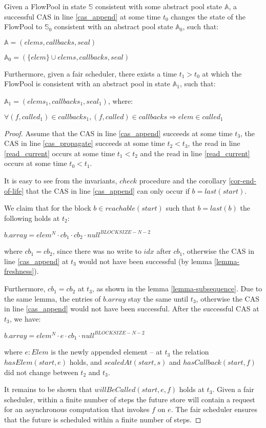 \documentclass[runningheads,a4paper]{llncs}
\begin{document}
\begin{lemma}\label{lemma-append}
Given a FlowPool in state $\mathbb{S}$ consistent with some abstract pool state $\mathbb{A}$, 
a successful CAS in line \ref{cas_append} at some time $t_0$ changes the state of the FlowPool 
to $\mathbb{S}_0$ consistent with an abstract pool state $\mathbb{A}_0$, such that:

$\mathbb{A} = (elems, callbacks, seal)$

$\mathbb{A}_0 = (\{elem\} \cup elems, callbacks, seal)$

Furthermore, given a fair scheduler, there exists a time $t_1 > t_0$ at which the FlowPool 
is consistent with an abstract pool in state $\mathbb{A}_1$, such that:

$\mathbb{A}_1 = (elems_1, callbacks_1, seal_1)$, where:

$\forall (f, called_1) \in callbacks_1, (f, called) \in callbacks \Rightarrow elem \in called_1$
\end{lemma}

\begin{proof}
Assume that the CAS in line \ref{cas_append} succeeds at some time
$t_3$, the CAS in line \ref{cas_propagate} succeeds at some time $t_2 <
t_3$, the read in line \ref{read_current} occurs at some time $t_1 <
t_2$ and the read in line \ref{read_current} occurs at some time $t_0
< t_1$.

It is easy to see from the invariants, $check$ procedure and the
corollary \ref{cor-end-of-life} that the CAS in line \ref{cas_append} can only
occur if $b = last(start)$.

We claim that for the block $b \in reachable(start)$ such that $b = last(b)$ the
following holds at $t_2$:

$b.array = elem^N \cdot cb_1 \cdot cb_2 \cdot null^{BLOCKSIZE - N - 2}$

where $cb_1 = cb_2$, since there was no write to $idx$ after $cb_1$, otherwise the
CAS in line \ref{cas_append} at $t_3$ would not have been successful
(by lemma \ref{lemma-freshness}).

Furthermore, $cb_1 = cb_2$ at $t_3$, as shown in the lemma
\ref{lemma-subsequence}. Due to the same lemma, the entries of
$b.array$ stay the same until $t_3$, otherwise the CAS in line
\ref{cas_append} would not have been successful.
After the successful CAS at $t_3$, we have:

$b.array = elem^N \cdot e \cdot cb_1 \cdot null^{BLOCKSIZE - N - 2}$

where $e: Elem$ is the newly appended element -- at $t_3$ the
relation $hasElem(start, e)$ holds, and $sealedAt(start, s)$ and
$hasCallback(start, f)$ did not change between $t_2$ and $t_3$.

It remains to be shown that $willBeCalled(start, e, f)$ holds at $t_3$.
Given a fair scheduler, within a finite number of steps the
future store will contain a request for an asynchronous computation
that invokes $f$ on $e$. The fair scheduler ensures that the future is
scheduled within a finite number of steps.
\end{proof}
\end{document}

